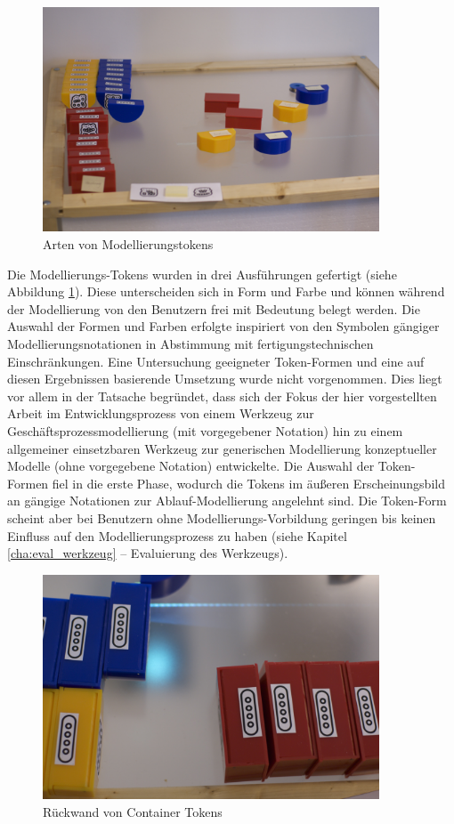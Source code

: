 \begin{figure}[htbp]
	\centering
		\includegraphics[width=10cm]{img/ImplementierungInput/TokenTypes.jpg}
	\caption{Arten von Modellierungstokens}
	\label{fig:img_ImplementierungInput_TokenTypes}
\end{figure}


Die Modellierungs-Tokens wurden in drei Ausführungen gefertigt (siehe Abbildung \ref{fig:img_ImplementierungInput_TokenTypes}). Diese unterscheiden sich in Form und Farbe und können während der Modellierung von den Benutzern frei mit Bedeutung belegt werden. Die Auswahl der Formen und Farben erfolgte inspiriert von den Symbolen gängiger Modellierungsnotationen in Abstimmung mit fertigungstechnischen Einschränkungen. Eine Untersuchung geeigneter Token-Formen und eine auf diesen Ergebnissen basierende Umsetzung wurde nicht vorgenommen. Dies liegt vor allem in der Tatsache begründet, dass sich der Fokus der hier vorgestellten Arbeit im Entwicklungsprozess von einem Werkzeug zur Geschäftsprozessmodellierung (mit vorgegebener Notation) hin zu einem allgemeiner einsetzbaren Werkzeug zur generischen Modellierung konzeptueller Modelle (ohne vorgegebene Notation) entwickelte. Die Auswahl der Token-Formen fiel in die erste Phase, wodurch die Tokens im äußeren Erscheinungsbild an gängige Notationen zur Ablauf-Modellierung angelehnt sind. Die Token-Form scheint aber bei Benutzern ohne Modellierungs-Vorbildung geringen bis keinen Einfluss auf den Modellierungsprozess zu haben (siehe Kapitel \ref{cha:eval_werkzeug} -- Evaluierung des Werkzeugs).

\begin{figure}[htbp]
	\centering
		\includegraphics[width=10cm]{img/ImplementierungInput/ContainerRueckseite.jpg}
	\caption{Rückwand von Container Tokens}
	\label{fig:img_ImplementierungInput_ContainerRueckseite}
\end{figure}

